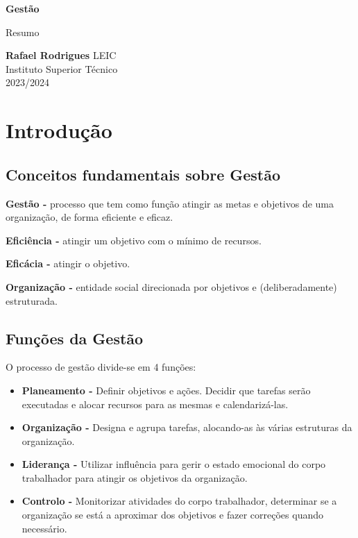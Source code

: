 \documentclass[11pt]{article}
\begin{document}
\begin{titlepage}
    \begin{center}
        \vspace*{1cm}

        \textbf{\LARGE Gestão}
        \vspace{0.5cm}

        \Large Resumo
        \vspace{1.5cm}

        \textbf{Rafael Rodrigues}
        \vfill
        LEIC \\
        Instituto Superior Técnico \\
        2023/2024
    \end{center}
\end{titlepage}

\tableofcontents

\newpage

\section{Introdução}

\subsection{Conceitos fundamentais sobre Gestão}

\textbf{Gestão -} processo que tem como função atingir as metas e objetivos de uma organização, de forma eficiente e eficaz.

\textbf{Eficiência -} atingir um objetivo com o mínimo de recursos.

\textbf{Eficácia -} atingir o objetivo.

\textbf{Organização -} entidade social direcionada por objetivos e (deliberadamente) estruturada.

\subsection{Funções da Gestão}

O processo de gestão divide-se em 4 funções:
\begin{itemize}[topsep=0pt]
    \item \textbf{Planeamento -} Definir objetivos e ações. Decidir que tarefas serão executadas e alocar recursos para as mesmas e calendarizá-las.
    \item \textbf{Organização -} Designa e agrupa tarefas, alocando-as às várias estruturas da organização.
    \item \textbf{Liderança -} Utilizar influência para gerir o estado emocional do corpo trabalhador para atingir os objetivos da organização.
    \item \textbf{Controlo -} Monitorizar atividades do corpo trabalhador, determinar se a organização se está a aproximar dos objetivos e fazer correções quando necessário.
\end{itemize}
\end{document}
